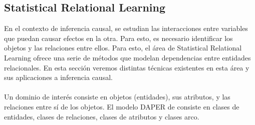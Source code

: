 \documentclass[11pt]{article}
\theoremstyle{plain}
\begin{document}
\subsection{Statistical Relational Learning}
En el contexto de inferencia causal, se estudian las interacciones entre variables que puedan causar efectos en la otra. Para esto, es necesario identificar los objetos y las relaciones entre ellos. Para esto, el área de Statistical Relational Learning ofrece una serie de métodos que modelan dependencias entre entidades relacionales. En esta sección veremos distintas técnicas existentes en esta área y sus aplicaciones a inferencia causal.\\
\\
Un dominio de interés consiste en objetos (entidades), sus atributos, y las relaciones entre sí de los objetos. El modelo DAPER de \cite{heckerman2004probabilistic} consiste en clases de entidades, clases de relaciones, clases de atributos y clases arco.
\end{document}
